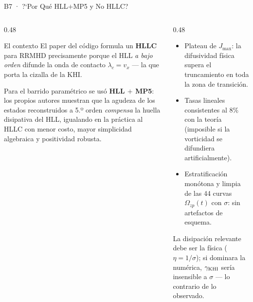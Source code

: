 \documentclass[aspectratio=169,9pt]{beamer}
\begin{document}
\begin{frame}{B7 · ?`Por Qu\'e HLL$+$MP5 y No HLLC?}
\begin{columns}[T]
\begin{column}{0.48\textwidth}
  \begin{block}{El contexto}
    \scriptsize
    El paper del c\'odigo \citep{miranda-aranguren-2018} formula un
    \textbf{HLLC} para RRMHD precisamente porque el HLL \emph{a bajo orden}
    difunde la onda de contacto $\lambda_c=v_x$ --- la que porta la
    cizalla de la KHI.
  \end{block}
  \begin{tcolorbox}[RES={La elecci\'on de este trabajo}]
    \scriptsize
    Para el barrido param\'etrico se us\'o \textbf{HLL $+$ MP5}:
    los propios autores muestran que la agudeza de los estados
    reconstruidos a 5.º orden \emph{compensa} la huella disipativa del HLL,
    igualando en la pr\'actica al HLLC con menor costo, mayor simplicidad
    algebraica y positividad robusta.
  \end{tcolorbox}
\end{column}
\begin{column}{0.48\textwidth}
  \begin{tcolorbox}[EQ={Verificaci\'on emp\'irica en este estudio}]
    \scriptsize
    \begin{itemize}\setlength\itemsep{2pt}
      \item Plateau de $J_{\max}$: la difusividad f\'isica supera el
            truncamiento en toda la zona de transici\'on.
      \item Tasas lineales consistentes al $8\%$ con la teor\'ia
            (imposible si la vorticidad se difundiera artificialmente).
      \item Estratificaci\'on mon\'otona y limpia de las 44 curvas
            $\Omega_{zp}(t)$ con $\sigma$: sin artefactos de esquema.
    \end{itemize}
  \end{tcolorbox}
  \vspace{0.08cm}
  {\scriptsize\color{INF3} La disipaci\'on relevante debe ser la f\'isica
   ($\eta=1/\sigma$); si dominara la num\'erica, $\gamma_{\rm KHI}$ ser\'ia
   insensible a $\sigma$ --- lo contrario de lo observado.}
\end{column}
\end{columns}
\end{frame}
\end{document}
